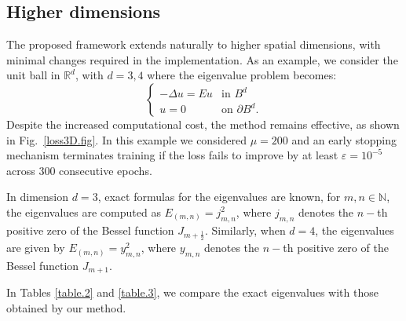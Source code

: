 \documentclass[11pt]{amsart}
\theoremstyle{definition}
\theoremstyle{remark}
\theoremstyle{plain}
\newcommand{\R}{\mathbb{R}}
\newcommand{\N}{\mathbb{N}}
\begin{document}
\subsection{Higher dimensions}

The proposed framework extends naturally to higher spatial dimensions, with minimal changes required in the implementation. As an example, we consider the unit ball in $\R^d$, with $d=3,4$ where the eigenvalue problem becomes:
$$
\begin{cases}
-\Delta u = Eu & \text{in } B^d\\
u=0 & \text{on }\partial B^d.
\end{cases}
$$
Despite the increased computational cost, the method remains effective, as shown in Fig.~\ref{loss3D.fig}. In this example we considered $\mu=200$ and an early stopping mechanism terminates training if the loss fails to improve by at least $\varepsilon =10^{-5}$ across 300 consecutive epochs.






%
%


In dimension $d=3$, exact formulas for the eigenvalues are known, for $m,n\in \N$, the eigenvalues are computed as $E_{(m,n)}=j_{m,n}^2$, where $j_{m,n}$ denotes the $n-$th positive zero of the Bessel function $J_{m+\frac12}$. Similarly, when $d=4$, the eigenvalues are given by $E_{(m,n)}=y_{m,n}^2$, where $y_{m,n}$ denotes the $n-$th positive zero of the Bessel function $J_{m+1}$.

In Tables \ref{table.2} and \ref{table.3}, we compare the exact eigenvalues with those obtained by our method.
\end{document}
